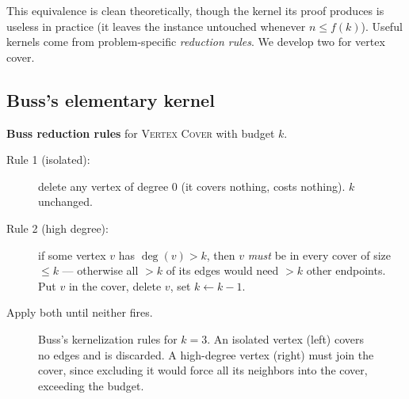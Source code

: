 This equivalence is clean theoretically, though the kernel its proof produces is useless in practice (it leaves the instance untouched whenever $n \le f(k)$). Useful kernels come from problem-specific \emph{reduction rules}. We develop two for vertex cover.

\subsection{Buss's elementary kernel}

\begin{focusbox}
\textbf{Buss reduction rules} for \textsc{Vertex Cover} with budget $k$.
\begin{description}
  \item[Rule 1 (isolated):] delete any vertex of degree $0$ (it covers nothing, costs nothing). $k$ unchanged.
  \item[Rule 2 (high degree):] if some vertex $v$ has $\deg(v) > k$, then $v$ \emph{must} be in every cover of size $\le k$ --- otherwise all $>k$ of its edges would need $>k$ other endpoints. Put $v$ in the cover, delete $v$, set $k \gets k-1$.
\end{description}
Apply both until neither fires.

\begin{figure}[H]
\centering
{}
\caption{Buss's kernelization rules for $k=3$. An isolated vertex (left) covers no edges and is discarded. A high-degree vertex (right) must join the cover, since excluding it would force all its neighbors into the cover, exceeding the budget.}
\label{ch25:fig-buss}
\end{figure}


\end{focusbox}

